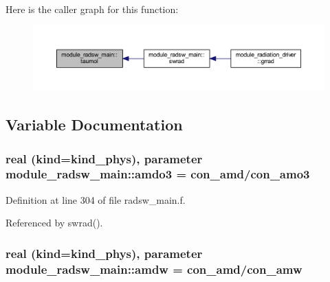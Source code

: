 Here is the caller graph for this function\+:\nopagebreak
\begin{figure}[H]
\begin{center}
\leavevmode
\includegraphics[width=350pt]{namespacemodule__radsw__main_afbfb76d4fab10254e065dce350ae5f2b_icgraph}
\end{center}
\end{figure}




\subsection{Variable Documentation}
\subsubsection[{\texorpdfstring{amdo3}{amdo3}}]{\setlength{\rightskip}{0pt plus 5cm}real (kind=kind\+\_\+phys), parameter module\+\_\+radsw\+\_\+main\+::amdo3 = con\+\_\+amd/con\+\_\+amo3\hspace{0.3cm}{\ttfamily [private]}}\hypertarget{namespacemodule__radsw__main_a527e5e1cec6ad0800f69a606fde77369}{}\label{namespacemodule__radsw__main_a527e5e1cec6ad0800f69a606fde77369}


Definition at line 304 of file radsw\+\_\+main.\+f.



Referenced by swrad().

\subsubsection[{\texorpdfstring{amdw}{amdw}}]{\setlength{\rightskip}{0pt plus 5cm}real (kind=kind\+\_\+phys), parameter module\+\_\+radsw\+\_\+main\+::amdw = con\+\_\+amd/con\+\_\+amw\hspace{0.3cm}{\ttfamily [private]}}\hypertarget{namespacemodule__radsw__main_a1445a63250d89083447371120c484618}{}\label{namespacemodule__radsw__main_a1445a63250d89083447371120c484618}



